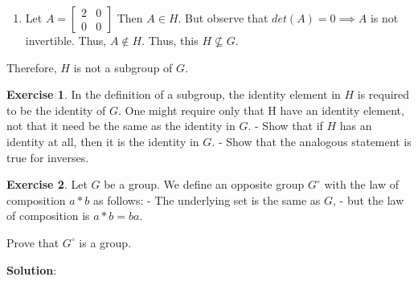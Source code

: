 \documentclass[
]{book}
\providecommand{\tightlist}{%
  \setlength{\itemsep}{0pt}\setlength{\parskip}{0pt}}
\theoremstyle{definition}
\theoremstyle{definition}
\theoremstyle{definition}
\newtheorem{exercise}{Exercise}[chapter]
\theoremstyle{definition}
\theoremstyle{remark}
\begin{document}
\begin{enumerate}
\def\labelenumi{(\alph{enumi})}
\setcounter{enumi}{4}
\tightlist
\item
  Let \(A=\begin{bmatrix} 2 & 0 \\ 0 & 0 \end{bmatrix}\) Then \(A\in H\). But observe that \(det(A)=0\implies A\) is not invertible. Thus, \(A\not\in H\). Thus, this \(H \not\subseteq G\).
\end{enumerate}

Therefore, \(H\) is not a subgroup of \(G\).

\begin{exercise}
\protect\hypertarget{exr:unnamed-chunk-51}{}\label{exr:unnamed-chunk-51}In the definition of a subgroup, the identity element in \(H\) is required to be the identity
of \(G\). One might require only that H have an identity element, not that it need be the
same as the identity in \(G\).
- Show that if \(H\) has an identity at all, then it is the identity in \(G\).
- Show that the analogous statement is true for inverses.
\end{exercise}

\begin{exercise}
\protect\hypertarget{exr:unnamed-chunk-52}{}\label{exr:unnamed-chunk-52}Let \(G\) be a group. We define an opposite group \(G^{\circ}\) with the law of composition \(a * b\) as follows:
- The underlying set is the same as \(G\),
- but the law of composition is \(a * b = ba\).

Prove that \(G^{\circ}\) is a group.
\end{exercise}

\textbf{Solution}:
\end{document}
